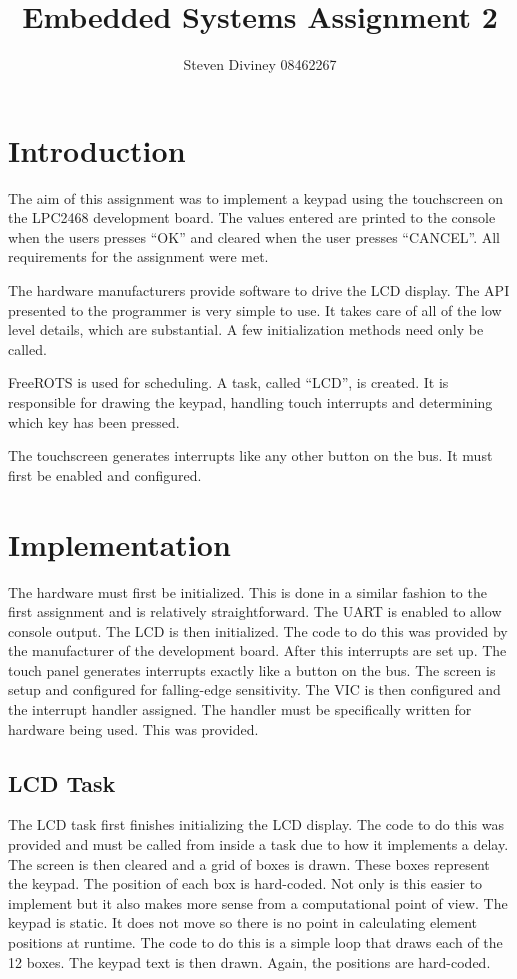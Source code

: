 \documentclass[a4paper, 10pt, titlepage]{article}
\title{Embedded Systems Assignment 2}
\author{Steven Diviney 08462267}
\begin{document}
\maketitle

\newpage



\section{Introduction}
The aim of this assignment was to implement a keypad using the touchscreen on the LPC2468 development board. The values entered are printed to the console when the users presses “OK” and cleared when the user presses “CANCEL”. All requirements for the assignment were met.

The hardware manufacturers provide software to drive the LCD display. The API presented to the programmer is very simple to use. It takes care of all of the low level details, which are substantial. A few initialization methods need only be called.

FreeROTS is used for scheduling. A task, called “LCD”, is created. It is responsible for drawing the keypad, handling touch interrupts and determining which key has been pressed.

The touchscreen generates interrupts like any other button on the bus. It must first be enabled and configured.  

\section{Implementation}
The hardware must first be initialized. This is done in a similar fashion to the first assignment and is relatively straightforward. The UART is enabled to allow console output. The LCD is then initialized. The code to do this was provided by the manufacturer of the development board. After this interrupts are set up. The touch panel generates interrupts exactly like a button on the bus. The screen is setup and configured for falling-edge sensitivity. The VIC is then configured and the interrupt handler assigned. The handler must be specifically written for hardware being used. This was provided.

\subsection{LCD Task}
The LCD task first finishes initializing the LCD display. The code to do this was provided and must be called from inside a task due to how it implements a delay. The screen is then cleared and a grid of boxes is drawn. 
These boxes represent the keypad. The position of each box is hard-coded. Not only is this easier to implement but it also makes more sense from a computational point of view. The keypad is static. It does not move so there is no point in calculating element positions at runtime. The code to do this is a simple loop that draws each of the 12 boxes. The keypad text is then drawn. Again, the positions are hard-coded. 
\end{document}
